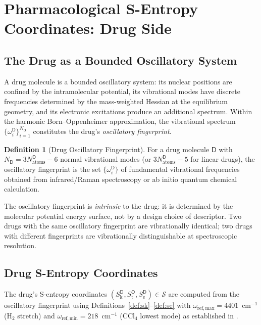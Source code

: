 \documentclass[11pt,twocolumn,a4paper]{article}
\theoremstyle{definition}
\newtheorem{definition}[theorem]{Definition}
\theoremstyle{remark}
\newcommand{\Sk}{S_{\mathrm{k}}}
\newcommand{\St}{S_{\mathrm{t}}}
\newcommand{\Se}{S_{\mathrm{e}}}
\newcommand{\Sspace}{\mathcal{S}}
\newcommand{\Drug}{\mathsf{D}}
\begin{document}
\section{Pharmacological S-Entropy Coordinates: Drug Side}
\label{sec:drug_coords}

\subsection{The Drug as a Bounded Oscillatory System}

A drug molecule is a bounded oscillatory system: its nuclear positions are confined by the intramolecular potential, its vibrational modes have discrete frequencies determined by the mass-weighted Hessian at the equilibrium geometry, and its electronic excitations produce an additional spectrum. Within the harmonic Born--Oppenheimer approximation, the vibrational spectrum $\{\omega_i^\Drug\}_{i=1}^{N_\Drug}$ constitutes the drug's \emph{oscillatory fingerprint}.

\begin{definition}[Drug Oscillatory Fingerprint]
\label{def:drug_fingerprint}
For a drug molecule $\Drug$ with $N_\Drug = 3N_{\mathrm{atoms}}^\Drug - 6$ normal vibrational modes (or $3N_{\mathrm{atoms}}^\Drug - 5$ for linear drugs), the oscillatory fingerprint is the set $\{\omega_i^\Drug\}$ of fundamental vibrational frequencies obtained from infrared/Raman spectroscopy or ab initio quantum chemical calculation.
\end{definition}

The oscillatory fingerprint is \emph{intrinsic} to the drug: it is determined by the molecular potential energy surface, not by a design choice of descriptor. Two drugs with the same oscillatory fingerprint are vibrationally identical; two drugs with different fingerprints are vibrationally distinguishable at spectroscopic resolution.

\subsection{Drug S-Entropy Coordinates}

The drug's S-entropy coordinates $(\Sk^\Drug, \St^\Drug, \Se^\Drug) \in \Sspace$ are computed from the oscillatory fingerprint using Definitions~\ref{def:sk}--\ref{def:se} with $\omega_{\mathrm{ref,max}} = 4401$~cm$^{-1}$ (H$_2$ stretch) and $\omega_{\mathrm{ref,min}} = 218$~cm$^{-1}$ (CCl$_4$ lowest mode) as established in \citep{sachikonye2025c}.
\end{document}
